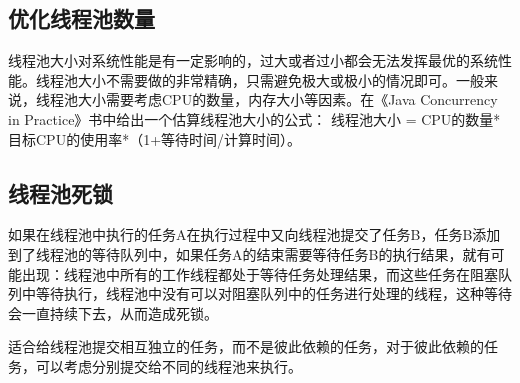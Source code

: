 \documentclass[a4paper]{report}
\begin{document}
\subsection{优化线程池数量}
线程池大小对系统性能是有一定影响的，过大或者过小都会无法发挥最优的系统性能。线程池大小不需要做的非常精确，只需避免极大或极小的情况即可。一般来说，线程池大小需要考虑CPU的数量，内存大小等因素。在《Java Concurrency in Practice》书中给出一个估算线程池大小的公式：
 线程池大小 = CPU的数量*目标CPU的使用率*（1+等待时间/计算时间）。

 \subsection{线程池死锁}
 如果在线程池中执行的任务A在执行过程中又向线程池提交了任务B，任务B添加到了线程池的等待队列中，如果任务A的结束需要等待任务B的执行结果，就有可能出现：线程池中所有的工作线程都处于等待任务处理结果，而这些任务在阻塞队列中等待执行，线程池中没有可以对阻塞队列中的任务进行处理的线程，这种等待会一直持续下去，从而造成死锁。

 适合给线程池提交相互独立的任务，而不是彼此依赖的任务，对于彼此依赖的任务，可以考虑分别提交给不同的线程池来执行。
\end{document}
